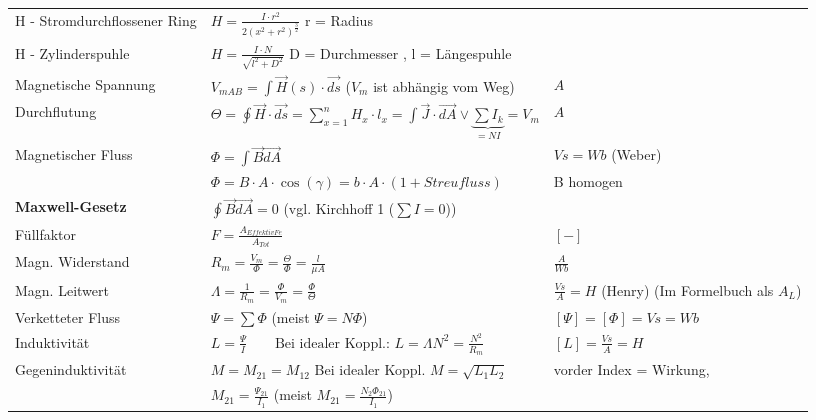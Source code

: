 \begin{tabular}[c]{ | p{5cm} | p{8cm} | p{4cm} | }
            H - Stromdurchflossener Ring & $ H =  \frac{I \cdot r^2}{2(x^2+r^2)^{\frac{3}{2}}}$ \qquad r = Radius &  \\
            H - Zylinderspuhle & $ H = \frac{I \cdot N}{\sqrt{l^2 + D^2}}$ \quad D = Durchmesser , l = Längespuhle & \\
            Magnetische Spannung &
            $V_{mAB} = \int\limits \vec{H}(s) \cdot \vec{ds}$ ($V_m$ ist abhängig vom Weg) &
            $A$ \\
            \hline
            Durchflutung &
            $\Theta = \oint\vec{H} \cdot \vec{ds} = \sum\limits_{x=1}^n H_x \cdot l_x = \int\limits \vec{J} \cdot \vec{dA} \vee \underbrace{\sum I_k}_{= N I} = V_m$ &
            $A$ \\
            \hline
            Magnetischer Fluss &
            $\Phi = \int \vec{B} \vec{dA}$ &
            $Vs = Wb$ (Weber) \\
            &
            $\Phi = B \cdot A \cdot \cos(\gamma)=b \cdot A \cdot (1+Streufluss)$ &
            B homogen \\
            \hline
            \textbf{Maxwell-Gesetz} &
            $\oint \vec{B} \vec{dA} = 0$ (vgl. Kirchhoff 1 ($\sum I = 0$)) &
            \\
            \hline
            Füllfaktor &
            $F=\frac{A_{Effektiv Fe}}{A_{Tot}}$ &
            $[-]$ \\
            \hline
            Magn. Widerstand &
            $R_m = \frac{V_m}{\Phi} = \frac{\Theta}{\Phi} = \frac{l}{\mu A} $ &
            $\frac{A}{Wb}$ \\
            \hline
            Magn. Leitwert &
            $\Lambda = \frac{1}{R_m} = \frac{\Phi}{V_m}=\frac{\Phi}{\Theta}$ &
            $\frac{Vs}{A} = H$ (Henry) (Im Formelbuch als $A_L$) \\
            \hline
            Verketteter Fluss &
            $\Psi = \sum \Phi $ (meist $\Psi = N \Phi$) &
            $[\Psi] = [\Phi] = Vs = Wb$ \\
            \hline
            Induktivität &
            $L = \frac{\Psi}{I}  \qquad \text{Bei idealer Koppl.: } L = \Lambda N^2 = \frac{N^2}{R_m} $ &
            $[L] = \frac{Vs}{A} = H$ \\
            \hline
            Gegeninduktivität &
            $M = M_{21} = M_{12}$ Bei idealer Koppl. $M = \sqrt{L_1 L_2}$ &
            vorder Index = Wirkung, \\
            &
            $M_{21} = \frac{\Psi_{21}}{I_1}$  (meist $M_{21} = \frac{N_2 \Phi_{21}}{I_1}$) &

\end{tabular}
